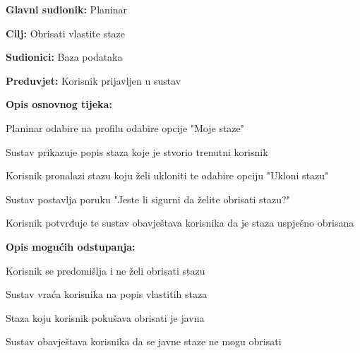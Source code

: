 			\noindent {}
			\begin{packed_item}
				
				\item \textbf{Glavni sudionik: }$ $Planinar$ $
				\item  \textbf{Cilj:} $ $Obrisati vlastite staze$ $
				\item  \textbf{Sudionici:} $ $Baza podataka$ $
				\item  \textbf{Preduvjet:} $ $Korisnik prijavljen u sustav$ $
				\item  \textbf{Opis osnovnog tijeka:}
				
				\item[] \begin{packed_enum}
					
					\item $ $Planinar odabire na profilu odabire opcije "Moje staze"$ $
					\item $ $Sustav prikazuje popis staza koje je stvorio trenutni korisnik$ $
					\item $ $Korisnik pronalazi stazu koju želi ukloniti te odabire opciju "Ukloni stazu"$ $	
					\item $ $Sustav postavlja poruku "Jeste li sigurni da želite obrisati stazu?"$ $
					\item $ $Korisnik potvrđuje te sustav obavještava korisnika da je staza uspješno obrisana $ $
				\end{packed_enum}
				\item  \textbf{Opis mogućih odstupanja:}
				
				\item[] \begin{packed_item}
					
					\item[3.a] $ $Korisnik se predomišlja i ne želi obrisati stazu$ $
					\item[] \begin{packed_enum}
						
						\item $ $Sustav vraća korisnika na popis vlastitih staza$ $
						\end{packed_enum}
					\item[4.a] $ $Staza koju korisnik pokušava obrisati je javna$ $
					\item[] \begin{packed_enum}
						\item $ $Sustav obavještava korisnika da se javne staze ne mogu obrisati$ $
					\end{packed_enum}
				\end{packed_item}
			\end{packed_item}
			
